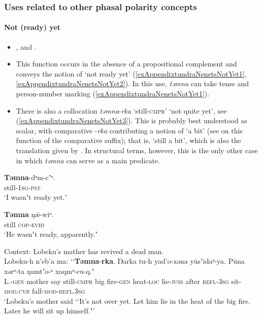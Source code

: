 	
\subsubsection{Uses related to other phasal polarity concepts}
\label{appendixTundraNenetsNotYet}
\paragraph{Not (ready) yet}
\begin{itemize}
	\item \textcite[458]{Lehtisalo1956}, \textcite[187]{Nikolaeva2014} and \textcite[624]{Tereshchenko2008}.
	\item This function occurs in the absence of a propositional complement and conveys the notion of \lq not ready yet' (\ref{exAppendixtundraNenetsNotYet1}, \ref{exAppendixtundraNenetsNotYet2}). In this use, \textit{təmna} can take tense and person-number marking (\ref{exAppendixtundraNenetsNotYet1}).
	\item There is also a collocation \textit{təmna}-\textit{rka} \lq still-\textsc{cmpr}' \lq not quite yet', see (\ref{exAppendixtundraNenetsNotYet3}). This is probably best understood as scalar, with comparative \mbox{-\textit{rka}} contributing a notion of \lq a bit' (see \cite[133–134]{Nikolaeva2014} on this function of the comparative suffix); that is, \lq still a bit', which is also the translation given by \textcite[458]{Lehtisalo1956}. In structural terms, however, this is the only other case in which \textit{təmna} can serve as a main predicate.
\end{itemize}
\begin{exe}
	\ex\label{exAppendixtundraNenetsNotYet1}
	\gll \textbf{Təmna}-dᵒm-cʼᵒ.\\
	still-1\textsc{sg}-\textsc{pst}\\
	\glt \lq I wasnʼt ready yet.ʼ \parencite[187]{Nikolaeva2014}
	
	\ex\label{exAppendixtundraNenetsNotYet2}
	\gll \textbf{Təmna} ŋǣ-wiᵒ.\\
	still \textsc{cop}-\textsc{evid}\\
	\glt \lq He wasnʼt ready, apparently.ʼ \parencite[187]{Nikolaeva2014}
		
	\ex\label{exAppendixtundraNenetsNotYet3}
	Context: Lobeku's mather has revived a dead man.\\
	\gll Lobeku-h n'eb'a ma: \lq\lq \textbf{Təmna}-\textbf{rka}. Ŋarka tu-h yad'o-xəna yūsʼidaᵒ-ya. Pūna xərᵒ-ta ŋamtʼo-ᵒ xaqmᵒ-cu-q."\\
		L.-\textsc{gen} mother say \phantom{\lq\lq}still-\textsc{cmpr} big fire-\textsc{gen} heat-\textsc{loc} lie-\textsc{juss} after \textsc{refl}-3\textsc{sg} sit-\textsc{mod}.\textsc{cvb} fall-\textsc{mod}-\textsc{refl}.3\textsc{sg}\\
	\glt \lq Lobeku's mother said \lq\lq It's not over yet. Let him lie in the heat of the big fire. Later he will sit up himself."\rq{ }\parencite[453–454]{Nikolaeva2014}
\end{exe}

